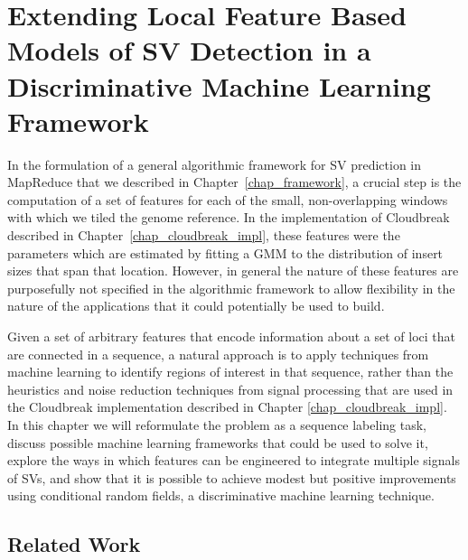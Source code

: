 \chapter{Extending Local Feature Based Models of SV Detection in a Discriminative Machine Learning Framework}\label{chap_crf}


In the formulation of a general algorithmic framework for SV prediction in MapReduce that we described in Chapter~\ref{chap_framework}, a crucial step is the computation of a set of features for each of the small, non-overlapping windows with which we tiled the genome reference. In the implementation of Cloudbreak described in Chapter~\ref{chap_cloudbreak_impl}, these features were the parameters which are estimated by fitting a GMM to the distribution of insert sizes that span that location. However, in general the nature of these features are purposefully not specified in the algorithmic framework to allow flexibility in the nature of the applications that it could potentially be used to build.

Given a set of arbitrary features that encode information about a set of loci that are connected in a sequence, a natural approach is to apply techniques from machine learning to identify regions of interest in that sequence, rather than the heuristics and noise reduction techniques from signal processing that are used in the Cloudbreak implementation described in Chapter \ref{chap_cloudbreak_impl}. In this chapter we will reformulate the problem as a sequence labeling task, discuss possible machine learning frameworks that could be used to solve it, explore the ways in which features can be engineered to integrate multiple signals of SVs, and show that it is possible to achieve modest but positive improvements using conditional random fields, a discriminative machine learning technique.

\section{Related Work}

